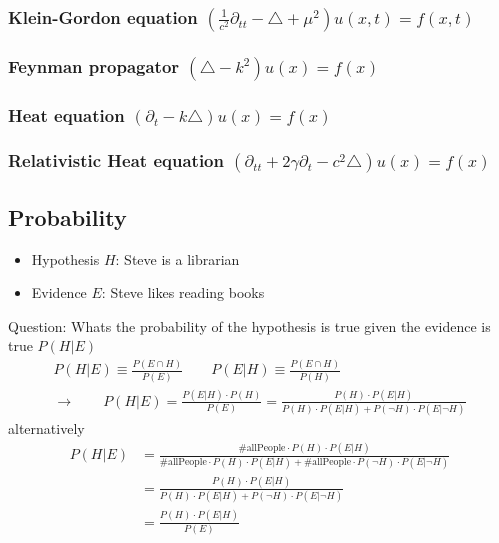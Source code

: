 \documentclass[10pt,a4paper]{article}
\theoremstyle{definition}
\begin{document}
\subsubsection{Klein-Gordon equation \texorpdfstring{$\left(\frac{1}{c^2}\partial_{tt}-\triangle+\mu^2\right) u(x,t)= f(x,t)$}{TEXT}}


\subsubsection{Feynman propagator \texorpdfstring{$\left(\triangle-k^2\right) u(x)= f(x)$}{TEXT}}

\subsubsection{Heat equation \texorpdfstring{$\left(\partial_{t}-k\triangle\right) u(x)= f(x)$}{TEXT}}

\subsubsection{Relativistic Heat equation \texorpdfstring{$\left(\partial_{tt}+2\gamma\partial_t-c^2\triangle\right) u(x)= f(x)$}{TEXT}}

\subsection{Probability}

\begin{itemize}
\item Hypothesis $H$: Steve is a librarian
\item Evidence $E$: Steve likes reading books
\end{itemize}
Question: Whats the probability of the hypothesis is true given the evidence is true $P(H|E)$ 
\begin{align}
   P(H|E)\equiv\frac{P(E\cap H)}{P(E)}\qquad P(E|H)\equiv\frac{P(E\cap H)}{P(H)}\\
   \rightarrow\qquad P(H|E)=\frac{P(E|H)\cdot P(H)}{P(E)}=\frac{P(H)\cdot P(E|H)}{P(H)\cdot P(E|H)+ P(\neg H)\cdot P(E|\neg H)}
\end{align}
alternatively
\begin{align}
  P(H|E)&=\frac{\#\text{allPeople}\cdot P(H)\cdot P(E|H)}{\#\text{allPeople}\cdot P(H)\cdot P(E|H)+\#\text{allPeople}\cdot P(\neg H)\cdot P(E|\neg H)}\\
  &=\frac{P(H)\cdot P(E|H)}{P(H)\cdot P(E|H)+ P(\neg H)\cdot P(E|\neg H)}\\
  &=\frac{P(H)\cdot P(E|H)}{P(E)}
\end{align}
\end{document}
